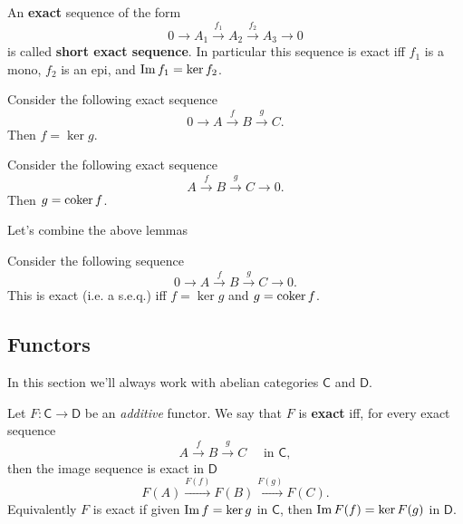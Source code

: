 \begin{defn}
	An \textbf{exact} sequence of the form
	\begin{equation}
	0 \to A_1 \xrightarrow{f_1} A_2 \xrightarrow{f_2} A_3 \to 0 
	\end{equation} 
	is called \textbf{short exact sequence}.
	In particular this sequence is exact iff
	$f_1$ is a mono, $f_2$ is an epi, and $\operatorname{Im} f_1 = \ker f_2$.
\end{defn}

\begin{lem}
	Consider the following exact sequence
	\begin{equation}
	0 \to A \xrightarrow{f} B \xrightarrow{g} C
	.\end{equation} 
	Then $f = \ker g$.
\end{lem} 

\begin{lem}
	Consider the following exact sequence
	\begin{equation}
	A \xrightarrow{f} B \xrightarrow{g} C \to 0
	.\end{equation} 
	Then $g = \operatorname{coker} f$.
\end{lem} 
Let's combine the above lemmas

\begin{prop}
	Consider the following sequence
	\begin{equation}
	0 \to A \xrightarrow{f} B \xrightarrow{g} C \to 0
	.\end{equation} 
	This is exact (i.e. a s.e.q.) iff $f = \ker g$ and $g = \operatorname{coker} f$.
\end{prop} 

\subsection{Functors}
In this section we'll always work with abelian categories $\mathsf{C}$ and $\mathsf{D}$.

\begin{defn}
	Let $F: \mathsf{C} \to \mathsf{D}$ be an {\em additive} functor.
	We say that $F$ is \textbf{exact} iff, for every exact sequence
	\begin{equation}
	A \xrightarrow{f} B \xrightarrow{g} C \quad \text{ in } \mathsf{C}
	,\end{equation} 
	then the image sequence is exact in $\mathsf{D}$ 
	\begin{equation}
	F(A) \xrightarrow{F(f)} F(B) \xrightarrow{F(g)} F(C)
	.\end{equation} 
	Equivalently $F$ is exact if given $\operatorname{Im} f = \ker g$ in $\mathsf{C}$, then
	$\operatorname{Im} F(f) = \ker F(g)$ in $\mathsf{D}$.
\end{defn}

